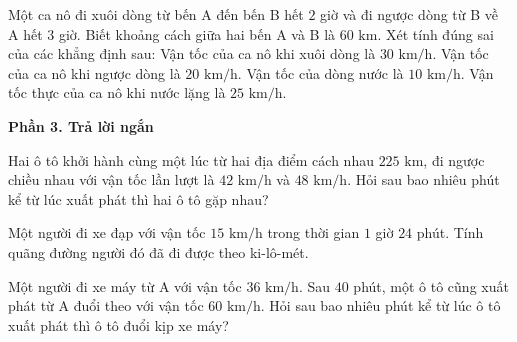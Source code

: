 \begin{ex} %
Một ca nô đi xuôi dòng từ bến A đến bến B hết $2$ giờ và đi ngược dòng từ B về A hết $3$ giờ. Biết khoảng cách giữa hai bến A và B là $60\text{ km}$. Xét tính đúng sai của các khẳng định sau:
\choiceTF
{\True Vận tốc của ca nô khi xuôi dòng là $30\text{ km/h}$.}
{\True Vận tốc của ca nô khi ngược dòng là $20\text{ km/h}$.}
{Vận tốc của dòng nước là $10\text{ km/h}$.}
{\True Vận tốc thực của ca nô khi nước lặng là $25\text{ km/h}$.}
\end{ex}

\textbf{Phần 3. Trả lời ngắn}

\begin{ex} %
Hai ô tô khởi hành cùng một lúc từ hai địa điểm cách nhau $225\text{ km}$, đi ngược chiều nhau với vận tốc lần lượt là $42\text{ km/h}$ và $48\text{ km/h}$. Hỏi sau bao nhiêu phút kể từ lúc xuất phát thì hai ô tô gặp nhau?
\end{ex}

\begin{ex} %
Một người đi xe đạp với vận tốc $15\text{ km/h}$ trong thời gian $1$ giờ $24$ phút. Tính quãng đường người đó đã đi được theo ki-lô-mét.
\end{ex}

\begin{ex} %
Một người đi xe máy từ A với vận tốc $36\text{ km/h}$. Sau $40$ phút, một ô tô cũng xuất phát từ A đuổi theo với vận tốc $60\text{ km/h}$. Hỏi sau bao nhiêu phút kể từ lúc ô tô xuất phát thì ô tô đuổi kịp xe máy?
\end{ex}


